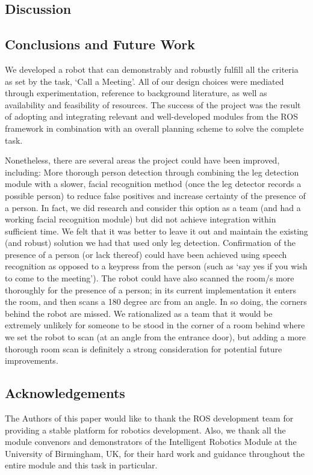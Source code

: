 \documentclass{article}
\begin{document}
\begin{multicols}{2}
    \section{Discussion}
    \subsection{Conclusions and Future Work}
    We developed a robot that  can demonstrably and robustly fulfill all the criteria as set by the task, ‘Call a Meeting’. All of our design choices were mediated through experimentation, reference to background literature, as well as availability and feasibility of resources. The success of the project was the result of adopting and integrating relevant and well-developed modules from the ROS framework in combination with an overall planning scheme to solve the complete task.

	Nonetheless, there are several areas the project could have been improved, including:  More thorough person detection through combining the leg detection module with a slower, facial recognition method (once the leg detector records a possible person) to reduce false positives and increase certainty of the presence of a person. In fact, we did research and consider this option as a team (and had a working facial recognition module) but did not achieve integration within sufficient time. We felt that it was better to leave it out and maintain the existing (and robust) solution we had that used only leg detection. Confirmation of the presence of a person (or lack thereof) could have been achieved using speech recognition as opposed to a keypress from the person (such as ‘say yes if you wish to come to the meeting’). The robot could have also scanned the room/s more thoroughly for the presence of a person; in its current implementation it enters the room, and then scans a 180 degree arc from an angle. In so doing, the corners behind the robot are missed. We rationalized as a team that it would be extremely unlikely for someone to be stood in the corner of a room behind where we set the robot to scan (at an angle from the entrance door), but adding a more thorough room scan is definitely a strong consideration for potential future improvements.
	
	\subsection{Acknowledgements}
	The Authors of this paper would like to thank the ROS development team for providing a stable platform for robotics development. Also, we thank all the module convenors and demonstrators of the Intelligent Robotics Module at the University of Birmingham, UK, for their hard work and guidance throughout the entire module and this task in particular.
\end{multicols}
    
\end{document}
